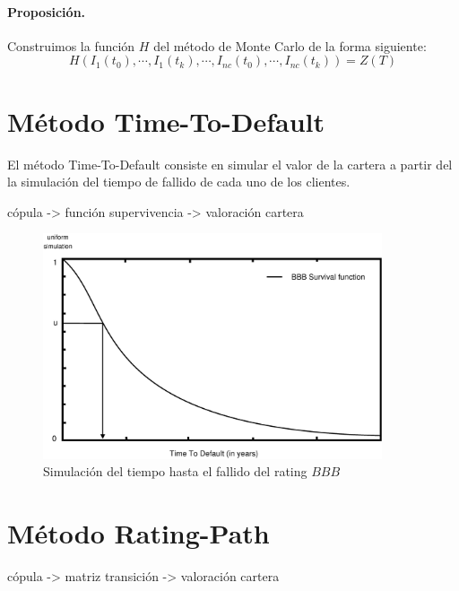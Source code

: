 \paragraph{Proposici\'on.} Construimos la funci\'on $H$ del m\'etodo de Monte 
Carlo de la forma siguiente:
\begin{displaymath}
H(I_1(t_0),\cdots,I_1(t_k),\cdots,I_{nc}(t_0),\cdots,I_{nc}(t_k)) = Z(T)
\end{displaymath}


\section{M\'etodo Time-To-Default}


El m\'etodo Time-To-Default consiste en simular el valor de la cartera a partir 
del la simulaci\'on del tiempo de fallido de cada uno de los clientes.

c\'opula -> funci\'on supervivencia -> valoraci\'on cartera

\begin{figure}[!hb]
\begin{center}
\includegraphics[width=10cm,angle=0]{./images/simttd.eps}
\caption{Simulaci\'on del tiempo hasta el fallido del rating $BBB$}
\label{simttd}
\end{center}
\end{figure}


\section{M\'etodo Rating-Path}
c\'opula -> matriz transici\'on -> valoraci\'on cartera

